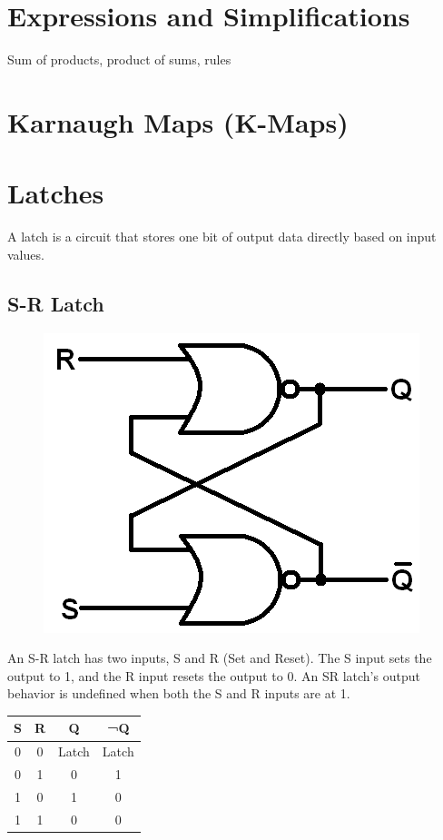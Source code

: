 \section{Expressions and Simplifications}

Sum of products, product of sums, rules

\section{Karnaugh Maps (K-Maps)}

\section{Latches}

A latch is a circuit that stores one bit of output data directly based on input values.

\subsection{S-R Latch}

\begin{figure}[h!]
	\includegraphics[scale=0.35]{./img/sr-latch.png}
\end{figure}

An S-R latch has two inputs, S and R (Set and Reset). The S input sets the output to 1, and the R input resets the output to 0. An SR latch's output behavior is undefined when both the S and R inputs are at 1. \\

\begin{tabular}{c c c c}
	\hline
	\textbf{S} & \textbf{R} & \textbf{Q} & \textbf{¬Q} \\ 
	\hline
	0 & 0 & Latch & Latch\\
	0 & 1 & 0 & 1\\
	1 & 0 & 1 & 0 \\
	1 & 1 & 0 & 0 \\
	\hline 
\end{tabular} \\

